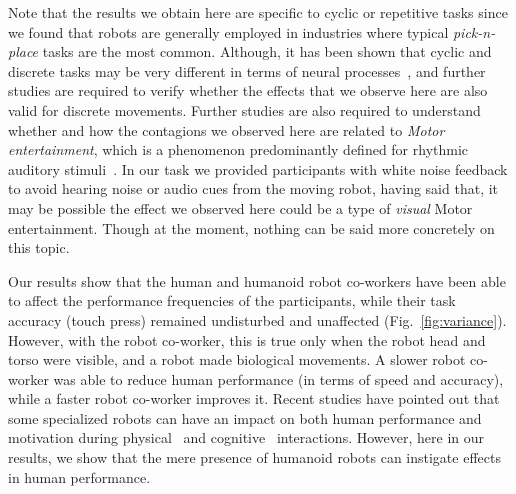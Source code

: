Note that the results we obtain here are specific to cyclic or repetitive tasks since we found that robots are generally employed in industries where typical \textit{pick-n-place} tasks are the most common. Although, it has been shown that cyclic and discrete tasks may be very different in terms of neural processes~\cite{Schaal:Nature:2004}, and further studies are required to verify whether the effects that we observe here are also valid for discrete movements. Further studies are also required to understand whether and how the contagions we observed here are related to \textit{Motor entertainment}, which is a phenomenon predominantly defined for rhythmic auditory stimuli~\cite{Tierney:Frontiers:2014,Schachner:Elsevier:2009}. In our task we provided participants with white noise feedback to avoid hearing noise or audio cues from the moving robot, having said that, it may be possible the effect we observed here could be a type of \textit{visual} Motor entertainment. Though at the moment, nothing can be said more concretely on this topic.


Our results show that the human and humanoid robot co-workers have been able to affect the performance frequencies of the participants, while their task accuracy (touch press) remained undisturbed and unaffected (Fig.~\ref{fig:variance}). However, with the robot co-worker, this is true only when the robot head and torso were visible, and a robot made biological movements. A slower robot co-worker was able to reduce human performance (in terms of speed and accuracy), while a faster robot co-worker improves it. Recent studies have pointed out that some specialized robots can have an impact on both human performance and motivation during physical~\cite{Takagi:Nature:2017} and cognitive~\cite{Fasola:ICDL:2010} interactions. However, here in our results, we show that the mere presence of humanoid robots can instigate effects in human performance. 



